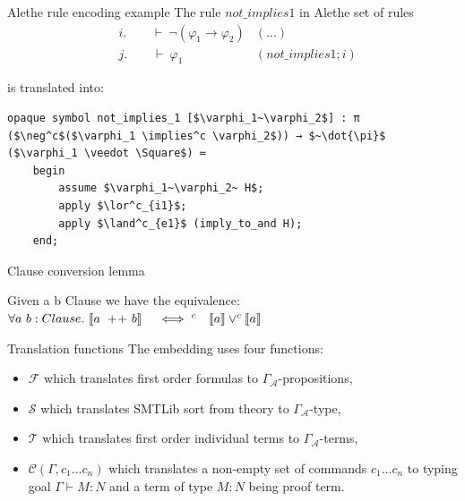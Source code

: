 \documentclass[aspectratio=169,xcolor={dvipsnames}]{beamer}
\begin{document}
\begin{frame}[t,fragile]{Alethe rule encoding example}
    The rule $not\_implies1$ in Alethe set of rules
    \begin{align*}
    & i. \quad \quad \vdash~ \neg (\varphi_1 \rightarrow \varphi_2) &(...)\\
    & j. \quad \quad \vdash~ \varphi_1  &(not\_implies1; i)
    \end{align*}
    
    is translated into:
    
    \begin{lstlisting}[mathescape=true]
    opaque symbol not_implies_1 [$\varphi_1~\varphi_2$] : π ($\neg^c$($\varphi_1 \implies^c \varphi_2$)) → $~\dot{\pi}$ ($\varphi_1 \veedot \Square$) ≔
    begin
        assume $\varphi_1~\varphi_2~ H$;
        apply $\lor^c_{i1}$;
        apply $\land^c_{e1}$ (imply_to_and H);
    end;
    \end{lstlisting}
\end{frame}

\begin{frame}{Clause conversion lemma}
\begin{lemma}
Given a b Clause we have the equivalence:\\
$\forall a~b: Clause.~ \llbracket a ~+\!+~ b \rrbracket \quad \iff^c \quad \llbracket a \rrbracket \lor^c \llbracket a \rrbracket $
\end{lemma}
\end{frame}


\begin{frame}{Translation functions}
    The embedding uses four functions:
    \begin{itemize}
        \item $\mathcal{F}$ which translates first order formulas to $\Gamma_\mathcal{A}$-propositions,
        \item $\mathcal{S}$ which translates SMTLib sort from theory to $\Gamma_\mathcal{A}$-type,
        \item $\mathcal{T}$ which translates first order individual terms to $\Gamma_\mathcal{A}$-terms,
        \item $\mathcal{C}(\Gamma, c_1 \dots c_n)$ which translates a non-empty set of commands $c_1 \dots c_n$ to typing goal $\Gamma \vdash M: N$ and a term of type $M: N$ being proof term.
    \end{itemize}
\end{frame}
\end{document}
